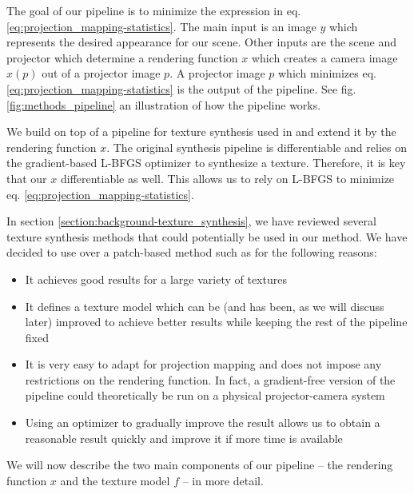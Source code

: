 
The goal of our pipeline is to minimize the expression in eq. \ref{eq:projection_mapping-statistics}. The main input is an image \(y\) which represents the desired appearance for our scene. Other inputs are the scene and projector which determine a rendering function \(x\) which creates a camera image \(x(p)\) out of a projector image \(p\). A projector image \(p\) which minimizes eq. \ref{eq:projection_mapping-statistics} is the output of the pipeline. See fig. \ref{fig:methods_pipeline} an illustration of how the pipeline works.

We build on top of a pipeline for texture synthesis used in \citet{Gatys2015} and extend it by the rendering function \(x\). The original synthesis pipeline is differentiable and relies on the gradient-based L-BFGS optimizer to synthesize a texture. Therefore, it is key that our \(x\) differentiable as well. This allows us to rely on L-BFGS to minimize eq. \ref{eq:projection_mapping-statistics}.

In section \ref{section:background-texture_synthesis}, we have reviewed several texture synthesis methods that could potentially be used in our method. We have decided to use \citet{Gatys2015} over a patch-based method such as \citet{Efros2001} for the following reasons:

\begin{itemize}
    \item It achieves good results for a large variety of textures
    \item It defines a texture model which can be (and has been, as we will discuss later) improved to achieve better results while keeping the rest of the pipeline fixed
    \item It is very easy to adapt for projection mapping and does not impose any restrictions on the rendering function. In fact, a gradient-free version of the pipeline could theoretically be run on a physical projector-camera system
    \item Using an optimizer to gradually improve the result allows us to obtain a reasonable result quickly and improve it if more time is available
\end{itemize}

We will now describe the two main components of our pipeline -- the rendering function \(x\) and the texture model \(f\) -- in more detail.

